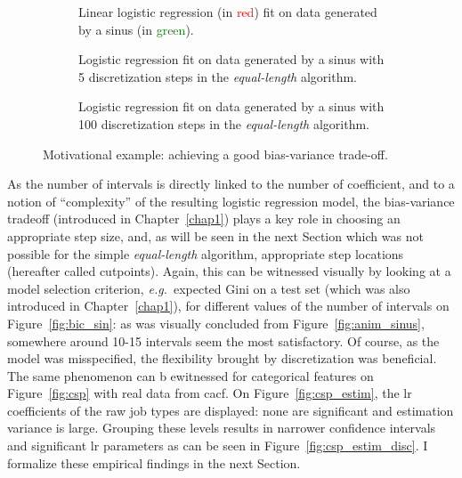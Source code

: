 \begin{figure}[!ht]
\begin{subfigure}[t]{\textwidth}
\centering \resizebox{.8\textwidth}{!}{}
\caption{\label{fig:sinus_lin} Linear logistic regression (in \textcolor{red}{red}) fit on data generated by a sinus (in \textcolor{green}{green}).}
\end{subfigure}
\begin{subfigure}[t]{\textwidth}
\centering \resizebox{.8\textwidth}{!}{}
\caption{\label{fig:sinus_deb} Logistic regression fit on data generated by a sinus with 5 discretization steps in the \textit{equal-length} algorithm.}
\end{subfigure}
\begin{subfigure}[t]{\textwidth}
\centering \resizebox{.8\textwidth}{!}{}
\caption{\label{fig:sinus_fin} Logistic regression fit on data generated by a sinus with 100 discretization steps in the \textit{equal-length} algorithm.}
\end{subfigure}
\caption{Motivational example: achieving a good bias-variance trade-off.}
\label{fig:sin_trois}
\end{figure}
 
As the number of intervals is directly linked to the number of coefficient, and to a notion of ``complexity'' of the resulting logistic regression model, the bias-variance tradeoff (introduced in Chapter~\ref{chap1}) plays a key role in choosing an appropriate step size, and, as will be seen in the next Section which was not possible for the simple \textit{equal-length} algorithm, appropriate step locations (hereafter called cutpoints). Again, this can be witnessed visually by looking at a model selection criterion, \textit{e.g.}\ expected Gini on a test set (which was also introduced in Chapter~\ref{chap1}), for different values of the number of intervals on Figure~\ref{fig:bic_sin}: as was visually concluded from Figure~\ref{fig:anim_sinus}, somewhere around 10-15 intervals seem the most satisfactory. Of course, as the model was misspecified, the flexibility brought by discretization was beneficial. The same phenomenon can b ewitnessed for categorical features on Figure~\ref{fig:csp} with real data from \gls{cacf}. On Figure~\ref{fig:csp_estim}, the \gls{lr} coefficients of the raw job types are displayed: none are significant and estimation variance is large. Grouping these levels results in narrower confidence intervals and significant \gls{lr} parameters as can be seen in Figure~\ref{fig:csp_estim_disc}.
I formalize these empirical findings in the next Section.



